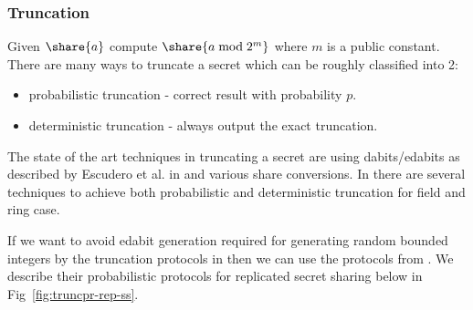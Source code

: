 \subsubsection{Truncation}
Given $\share{a}$ compute $\share{a \bmod 2^m}$ where $m$ is a public constant.
There are many ways to truncate a secret which can be roughly classified into 2:
\begin{itemize}
  \item probabilistic truncation - correct result with probability $p$.
  \item deterministic truncation - always output the exact truncation.
\end{itemize}

\noindent
The state of the art techniques in truncating a secret are using
dabits/edabits as described by Escudero et al. in \cite{C:EGKRS20} and
various share conversions. In \cite{C:EGKRS20} there are several techniques
to achieve both probabilistic and deterministic truncation for field and ring
case.

If we want to avoid edabit generation required for generating random bounded integers
by the truncation protocols in \cite{C:EGKRS20} then we can use the protocols from
\cite{PoPETS:DalEscKel20}. We describe their probabilistic protocols for replicated secret
sharing below in Fig~\ref{fig:truncpr-rep-ss}.

